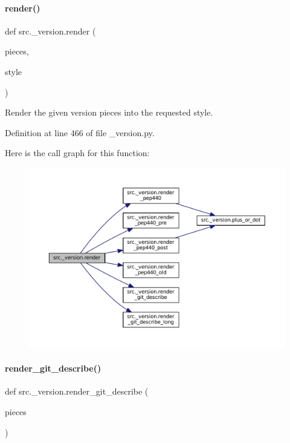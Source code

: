 \paragraph{\texorpdfstring{render()}{render()}}
{\footnotesize\ttfamily def src.\+\_\+version.\+render (\begin{DoxyParamCaption}\item[{}]{pieces,  }\item[{}]{style }\end{DoxyParamCaption})}



Render the given version pieces into the requested style. 



Definition at line 466 of file \+\_\+version.\+py.

Here is the call graph for this function\+:
\nopagebreak
\begin{figure}[H]
\begin{center}
\leavevmode
\includegraphics[width=350pt]{namespacesrc_1_1__version_a993e064384f8f9986d0ef6f48f7e967c_cgraph}
\end{center}
\end{figure}
\mbox{\label{namespacesrc_1_1__version_afab0479c00019cd66c0000ffb3fcba2f}} 
\paragraph{\texorpdfstring{render\+\_\+git\+\_\+describe()}{render\_git\_describe()}}
{\footnotesize\ttfamily def src.\+\_\+version.\+render\+\_\+git\+\_\+describe (\begin{DoxyParamCaption}\item[{}]{pieces }\end{DoxyParamCaption})}



